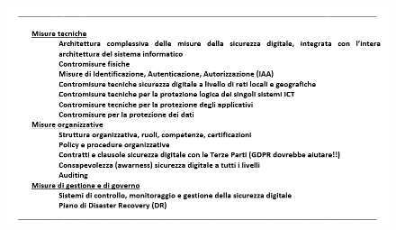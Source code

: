 \documentclass{easychair}
\begin{document}
\begin{figure}
	\centering
		\includegraphics[width=1\textwidth]{pictures/fig8.png}
		\caption{}
		\label{fig:8}
\end{figure}
\end{document}
